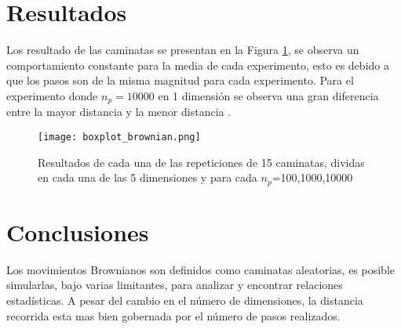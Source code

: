 \documentclass{article}
\begin{document}
\section{Resultados}
Los resultado de las caminatas se presentan en la Figura \ref{CBP_1}, se observa un comportamiento constante para la media de cada experimento, esto es debido a que los pasos son de la misma magnitud para cada experimento. Para el experimento donde $n_p=10000$ en 1 dimensión se observa una gran diferencia entre la mayor distancia y la menor distancia  .
\begin{figure}[h] %
    \centering
    \texttt{[image: boxplot\_brownian.png]} %
    \caption{Resultados de cada una de las repeticiones de 15 caminatas, dividas en cada una de las 5 dimensiones y para cada $n_p$=100,1000,10000 }
    \label{CBP_1}
\end{figure}
\section{Conclusiones}
Los movimientos Brownianos son definidos como caminatas aleatorias, es posible simularlas, bajo varias limitantes, para analizar y encontrar relaciones estadísticas. A pesar del cambio en el número de dimensiones, la distancia recorrida esta mas bien gobernada por el número de pasos realizados. 


\end{document}
